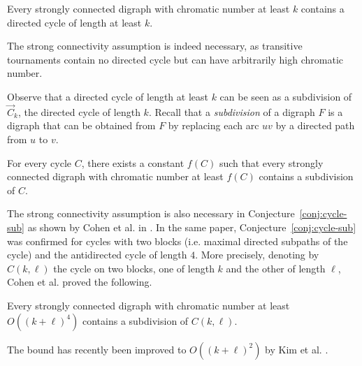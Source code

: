 \documentclass{endm}
\begin{document}
\begin{theorem}\label{thm:bondy}
Every strongly connected digraph with chromatic number at least $k$ contains a directed cycle of length at least $k$.
\end{theorem} 

The strong connectivity assumption is indeed necessary, as transitive tournaments contain no directed cycle but can have arbitrarily  high chromatic number. 

Observe that a directed cycle of length at least $k$ can be seen as a subdivision of $\vec{C}_k$, the directed cycle of length $k$.
Recall that a {\it subdivision} of a digraph $F$ is a digraph that can be obtained from $F$ by replacing each arc $uv$ by a directed path from $u$ to $v$.

\begin{conjecture}\label{conj:cycle-sub}
For every cycle $C$, there exists a constant $f(C)$ such that every strongly connected digraph with chromatic number at least $f(C)$ contains a subdivision of $C$.
\end{conjecture}

The strong connectivity assumption is also necessary in Conjecture~\ref{conj:cycle-sub} as shown by Cohen et al. in  \cite{CHLN16}.
In the same paper, Conjecture~\ref{conj:cycle-sub} was confirmed for cycles with two blocks (i.e. maximal directed subpaths of the cycle) and the antidirected cycle of length $4$.
More precisely, denoting by $C(k,\ell)$ the cycle on two blocks, one of length $k$ and the other of length $\ell$,
 Cohen et al. \cite{CHLN16} proved the following.
\begin{theorem}\label{th:ckl}
Every strongly connected digraph with chromatic number at least $O((k+\ell)^4)$ contains a subdivision of $C(k,\ell)$.
\end{theorem} 
The bound has recently been improved to $O((k+\ell)^2)$  by Kim et al. \cite{KKPM}.  
\end{document}
